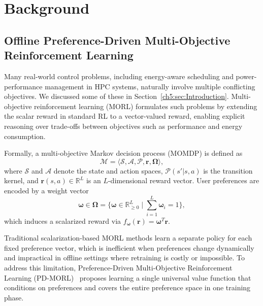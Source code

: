 \section{Background}

\subsection{Offline Preference-Driven Multi-Objective Reinforcement Learning}
\label{sec:PDMORL}

Many real-world control problems, including energy-aware scheduling and power-performance management in HPC systems, naturally involve multiple conflicting objectives. We discussed some of these in Section~\ref{ch5:sec:Introduction}. Multi-objective reinforcement learning (MORL) formulates such problems by extending the scalar reward in standard RL to a vector-valued reward, enabling explicit reasoning over trade-offs between objectives such as performance and energy consumption.

Formally, a multi-objective Markov decision process (MOMDP) is defined as
\begin{equation}
    \mathcal{M} = \langle \mathcal{S}, \mathcal{A}, \mathcal{P}, 
    \mathbf{r}, \boldsymbol{\Omega} \rangle,
    \label{eq:MOMDP}
\end{equation}
where $\mathcal{S}$ and $\mathcal{A}$ denote the state and action spaces, $\mathcal{P}(s'\vert s,a)$ is the transition kernel, and $\mathbf{r}(s,a) \in \mathbb{R}^L$ is an $L$-dimensional reward vector. User preferences are encoded by a weight vector
\begin{equation}
    \boldsymbol{\omega} \in \boldsymbol{\Omega} = \Big\{
    \boldsymbol{\omega} \in \mathbb{R}^L_{\geq 0} \;\Big\vert\; 
    \sum^{L}_{i=1}\boldsymbol{\omega}_i = 1 \Big\},
    \label{eq:preference_weight_vector}
\end{equation}
which induces a scalarized reward via $f_{\boldsymbol{\omega}}(\mathbf{r}) = \boldsymbol{\omega}^T\mathbf{r}$.

Traditional scalarization-based MORL methods learn a separate policy for each fixed preference vector, which is inefficient when preferences change dynamically and impractical in offline settings where retraining is costly or impossible. To address this limitation, Preference-Driven Multi-Objective Reinforcement Learning (PD-MORL)~\cite{basaklar2023pdmorlpreferencedrivenmultiobjectivereinforcement} proposes learning a single universal value function that conditions on preferences and covers the entire preference space in one training phase.

